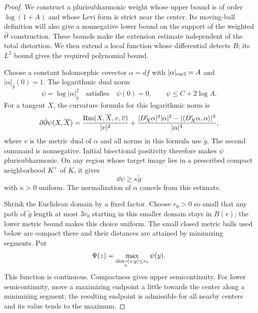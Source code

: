 \begin{proof}
We construct a plurisubharmonic weight whose upper bound is of order
$\log(1+A)$ and whose Levi form is strict near the center.
Its moving-ball definition will also give a nonnegative lower bound
on the support of the weighted $\bar\partial$ construction.  These bounds
make the extension estimate independent of the total distortion.
We then extend a local function whose differential detects $B$;
its $L^2$ bound gives the required polynomial bound.

Choose a constant holomorphic covector $\alpha=df$ with
$|\alpha|_{\rm eucl}=A$ and $|\alpha|_{\widetilde g}(0)=1$.
The logarithmic dual norm
\[
 \psi=\log|\alpha|_{\widetilde g}^2
 \quad\text{satisfies}\quad
 \psi(0)=0,\qquad \psi\le C+2\log A.
\]
For a tangent $X$, the curvature formula for this logarithmic norm is
\[
 \partial\bar\partial\psi(X,\overline X)
 =\frac{\operatorname{Rm}(X,\overline X,v,\overline v)}{|v|^2}
  +\frac{|D'_X\alpha|^2|\alpha|^2
       -|\langle D'_X\alpha,\alpha\rangle|^2}{|\alpha|^4},
\]
where $v$ is the metric dual of $\alpha$ and all norms in this
formula use $\widetilde g$.  The second summand is nonnegative.
Initial bisectional positivity therefore makes $\psi$
plurisubharmonic.  On any region whose target image
lies in a prescribed compact neighborhood $K^+$ of $K$, it gives
\begin{equation}\label{chart:strict-covector}
 \dd\psi\ge\kappa\widetilde g
\end{equation}
with $\kappa>0$ uniform.  The normalization of $\alpha$ cancels
from this estimate.

Shrink the Euclidean domain by a fixed factor.  Choose $r_0>0$
so small that any path of $\widetilde g$ length at most $3r_0$
starting in this smaller domain stays in $B(r)$; the lower
metric bound makes this choice uniform.  The small closed metric
balls used below are compact there and their distances are
attained by minimizing segments.  Put
\begin{equation}\label{chart:metric-ball-envelope}
 \Psi(z)=\max_{\operatorname{dist}_{\widetilde g}(z,y)\le r_0}\psi(y).
\end{equation}
This function is continuous.  Compactness gives upper
semicontinuity.  For lower semicontinuity, move a maximizing
endpoint a little towards the center along a minimizing segment;
the resulting endpoint is admissible for all nearby centers and
its value tends to the maximum.


\end{proof}
